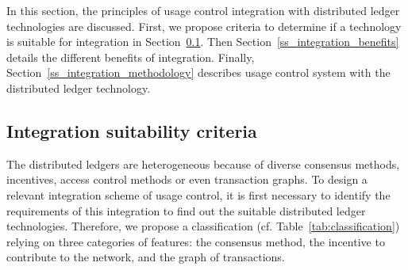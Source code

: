 In this section, the principles of usage control integration with distributed ledger technologies are discussed. First, we propose criteria to determine if a technology is suitable for integration in Section~\ref{ss_integrability_criteria}. Then Section~\ref{ss_integration_benefits} details the different benefits of integration. 
Finally, Section~\ref{ss_integration_methodology} describes  usage control system with the distributed ledger technology.

\subsection{Integration suitability criteria}
\label{ss_integrability_criteria}


The distributed ledgers are heterogeneous because of diverse consensus methods, incentives, access control methods or even transaction graphs. To design a relevant integration scheme of usage control, it is first necessary to identify the requirements of this integration to find out the suitable distributed ledger technologies. Therefore, we propose a classification (cf. Table~\ref{tab:classification}) relying on three categories of features: the consensus method, the incentive to contribute to the network, and the graph of transactions. 


